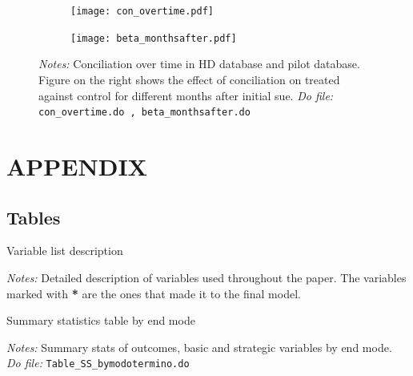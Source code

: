 \documentclass[11pt]{article}
\begin{document}
      
\begin{figure}[H]
    \caption{Conciliation over time}
    \label{Figure_dynamicsConciliation}
    \begin{center}
    \begin{subfigure}{0.49\textwidth}
    \centering
        \texttt{[image: con\_overtime.pdf]}
     \end{subfigure}
        \begin{subfigure}{0.49\textwidth}    
         \centering
        \texttt{[image: beta\_monthsafter.pdf]}
     \end{subfigure}
        \end{center}
        {\footnotesize \textit{Notes: } Conciliation over time in HD database and pilot database. Figure on the right shows the effect of conciliation on treated against control for different months after initial sue.}
        {\footnotesize \textit{Do file: } \texttt{con\_overtime.do , beta\_monthsafter.do}}
\end{figure}





\section{APPENDIX}

\subsection{Tables}



\begin{table}[H]
    \caption{Variable list description }
    \label{tab:SS}
    \begin{center}
        \scriptsize{}
    \end{center}
    \footnotesize
    \textit{Notes:} 
Detailed description of variables used throughout the paper. The variables marked with \textbf{*} are the ones that made it to the final model.
\end{table}

\begin{table}[H]
    \caption{Summary statistics table by end mode }
    \label{tab:SS}
    \begin{center}
        \tiny{}
    \end{center}
    \footnotesize
    \textit{Notes:} 
Summary stats of outcomes, basic and strategic variables by end mode.
    \textit{Do file: } \texttt{Table\_SS\_bymodotermino.do}
\end{table}
\end{document}
